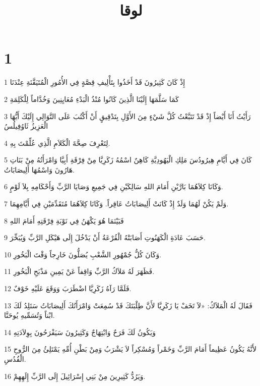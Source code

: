

\title{لوقا}


\chapter{1}

\par 1 إِذْ كَانَ كَثِيرُونَ قَدْ أَخَذُوا بِتَأْلِيفِ قِصَّةٍ فِي الأُمُورِ الْمُتَيَقَّنَةِ عِنْدَنَا
\par 2 كَمَا سَلَّمَهَا إِلَيْنَا الَّذِينَ كَانُوا مُنْذُ الْبَدْءِ مُعَايِنِينَ وَخُدَّاماً لِلْكَلِمَةِ
\par 3 رَأَيْتُ أَنَا أَيْضاً إِذْ قَدْ تَتَبَّعْتُ كُلَّ شَيْءٍ مِنَ الأَوَّلِ بِتَدْقِيقٍ أَنْ أَكْتُبَ عَلَى التَّوَالِي إِلَيْكَ أَيُّهَا الْعَزِيزُ ثَاوُفِيلُسُ
\par 4 لِتَعْرِفَ صِحَّةَ الْكَلاَمِ الَّذِي عُلِّمْتَ بِهِ.
\par 5 كَانَ فِي أَيَّامِ هِيرُودُسَ مَلِكِ الْيَهُودِيَّةِ كَاهِنٌ اسْمُهُ زَكَرِيَّا مِنْ فِرْقَةِ أَبِيَّا وَامْرَأَتُهُ مِنْ بَنَاتِ هَارُونَ وَاسْمُهَا أَلِيصَابَاتُ.
\par 6 وَكَانَا كِلاَهُمَا بَارَّيْنِ أَمَامَ اللهِ سَالِكَيْنِ فِي جَمِيعِ وَصَايَا الرَّبِّ وَأَحْكَامِهِ بِلاَ لَوْمٍ.
\par 7 وَلَمْ يَكُنْ لَهُمَا وَلَدٌ إِذْ كَانَتْ أَلِيصَابَاتُ عَاقِراً. وَكَانَا كِلاَهُمَا مُتَقَدِّمَيْنِ فِي أَيَّامِهِمَا.
\par 8 فَبَيْنَمَا هُوَ يَكْهَنُ فِي نَوْبَةِ فِرْقَتِهِ أَمَامَ اللهِ
\par 9 حَسَبَ عَادَةِ الْكَهَنُوتِ أَصَابَتْهُ الْقُرْعَةُ أَنْ يَدْخُلَ إِلَى هَيْكَلِ الرَّبِّ وَيُبَخِّرَ.
\par 10 وَكَانَ كُلُّ جُمْهُورِ الشَّعْبِ يُصَلُّونَ خَارِجاً وَقْتَ الْبَخُورِ.
\par 11 فَظَهَرَ لَهُ مَلاَكُ الرَّبِّ وَاقِفاً عَنْ يَمِينِ مَذْبَحِ الْبَخُورِ.
\par 12 فَلَمَّا رَآهُ زَكَرِيَّا اضْطَرَبَ وَوَقَعَ عَلَيْهِ خَوْفٌ.
\par 13 فَقَالَ لَهُ الْمَلاَكُ: «لاَ تَخَفْ يَا زَكَرِيَّا لأَنَّ طِلْبَتَكَ قَدْ سُمِعَتْ وَامْرَأَتُكَ أَلِيصَابَاتُ سَتَلِدُ لَكَ ابْناً وَتُسَمِّيهِ يُوحَنَّا.
\par 14 وَيَكُونُ لَكَ فَرَحٌ وَابْتِهَاجٌ وَكَثِيرُونَ سَيَفْرَحُونَ بِوِلاَدَتِهِ
\par 15 لأَنَّهُ يَكُونُ عَظِيماً أَمَامَ الرَّبِّ وَخَمْراً وَمُسْكِراً لاَ يَشْرَبُ وَمِنْ بَطْنِ أُمِّهِ يَمْتَلِئُ مِنَ الرُّوحِ الْقُدُسِ.
\par 16 وَيَرُدُّ كَثِيرِينَ مِنْ بَنِي إِسْرَائِيلَ إِلَى الرَّبِّ إِلَهِهِمْ.
